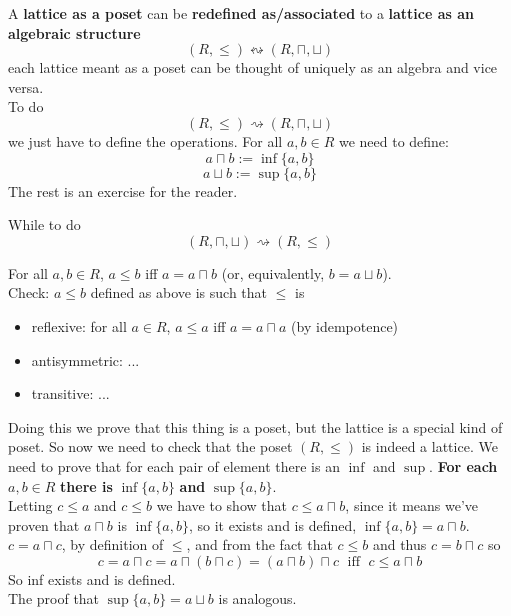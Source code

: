 	A \textbf{lattice as a poset} can be \textbf{redefined as/associated} to a \textbf{lattice as an algebraic structure}
	$$ (R, \leq ) \leftrightsquigarrow (R, \sqcap, \sqcup)$$
	each lattice meant as a poset can be thought of uniquely as an algebra and vice versa.\\

	To do
	$$ (R, \leq ) \rightsquigarrow (R, \sqcap, \sqcup) $$
	we just have to define the operations. For all $a,b \in R$ we need to define:
	$$ a \sqcap b := \inf \{a, b\}$$
	$$ a \sqcup b := \sup \{a,b\}$$
	The rest is an exercise for the reader.\\

	\newpage

	While to do
	$$ (R, \sqcap, \sqcup ) \rightsquigarrow (R, \leq) $$

	For all $a,b \in R$, $a \leq b$ iff $a = a\sqcap b$ (or, equivalently, $b = a \sqcup b$).\\

	Check: $a \leq b$ defined as above is such that $\leq$ is
	\begin{itemize}
		\item reflexive: for all $a \in R$, $a \leq a$ iff $a = a \sqcap a$ (by idempotence)
		\item antisymmetric: ...
		\item transitive: ...
	\end{itemize}

	Doing this we prove that this thing is a poset, but the lattice is a special kind of poset. So now we need to check that the poset $(R, \leq)$ is indeed a lattice. We need to prove that for each pair of element there is an $\inf$ and $\sup$. \textbf{For each} $a,b \in R$ \textbf{there is} $\inf\{a,b\}$ \textbf{and} $\sup \{a,b\}$.\\

	Letting $c \leq a$ and $c \leq b$ we have to show that $c \leq a \sqcap b$, since it means we've proven that $a \sqcap b$ is $\inf\{a,b\}$, so it exists and is defined, $\inf\{a,b\} = a \sqcap b$.\\

	$c = a \sqcap c$, by definition of $\leq$, and from the fact that $c \leq b$ and thus $c = b \sqcap c$ so
	$$ c = a \sqcap c = a \sqcap (b \sqcap c) = (a \sqcap b) \sqcap c \; \text{ iff } \; c \leq a \sqcap b$$
	So inf exists and is defined.\\

	The proof that $\sup\{a,b\} = a \sqcup b$ is analogous.\\

